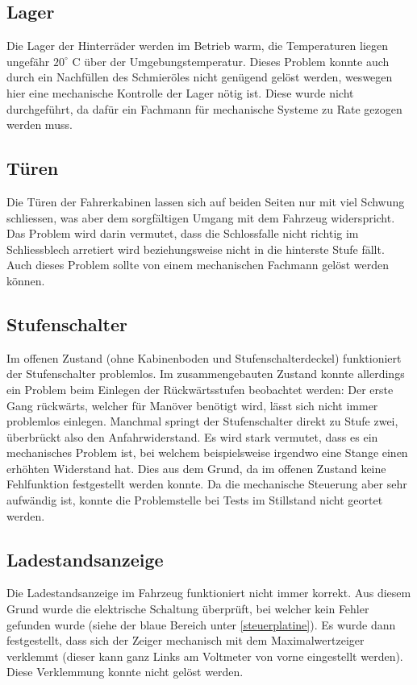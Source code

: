 \subsection{Lager}
Die Lager der Hinterräder werden im Betrieb warm, die Temperaturen liegen ungefähr $20^\circ$ C über der Umgebungstemperatur. Dieses Problem konnte auch durch ein Nachfüllen des Schmieröles nicht genügend gelöst werden, weswegen hier eine mechanische Kontrolle der Lager nötig ist. Diese wurde nicht durchgeführt, da dafür ein Fachmann für mechanische Systeme zu Rate gezogen werden muss.

\subsection{Türen}
Die Türen der Fahrerkabinen lassen sich auf beiden Seiten nur mit viel Schwung schliessen, was aber dem sorgfältigen Umgang mit dem Fahrzeug widerspricht. Das Problem wird darin vermutet, dass die Schlossfalle nicht richtig im Schliessblech arretiert wird beziehungsweise nicht in die hinterste Stufe fällt. Auch dieses Problem sollte von einem mechanischen Fachmann gelöst werden können.

\subsection{Stufenschalter}
Im offenen Zustand (ohne Kabinenboden und Stufenschalterdeckel) funktioniert der Stufenschalter problemlos. Im zusammengebauten Zustand konnte allerdings ein Problem beim Einlegen der Rückwärtsstufen beobachtet werden: Der erste Gang rückwärts, welcher für Manöver benötigt wird, lässt sich nicht immer problemlos einlegen. Manchmal springt der Stufenschalter direkt zu Stufe zwei, überbrückt also den Anfahrwiderstand. Es wird stark vermutet, dass es ein mechanisches Problem ist, bei welchem beispielsweise irgendwo eine Stange einen erhöhten Widerstand hat. Dies aus dem Grund, da im offenen Zustand keine Fehlfunktion festgestellt werden konnte. Da die mechanische Steuerung aber sehr aufwändig ist, konnte die Problemstelle bei Tests im Stillstand nicht geortet werden.

\subsection{Ladestandsanzeige}
Die Ladestandsanzeige im Fahrzeug funktioniert nicht immer korrekt. Aus diesem Grund wurde die elektrische Schaltung überprüft, bei welcher kein Fehler gefunden wurde (siehe der blaue Bereich unter \ref{steuerplatine}). Es wurde dann festgestellt, dass sich der Zeiger mechanisch mit dem Maximalwertzeiger verklemmt (dieser kann ganz Links am Voltmeter von vorne eingestellt werden). Diese Verklemmung konnte nicht gelöst werden.

\color{black}
